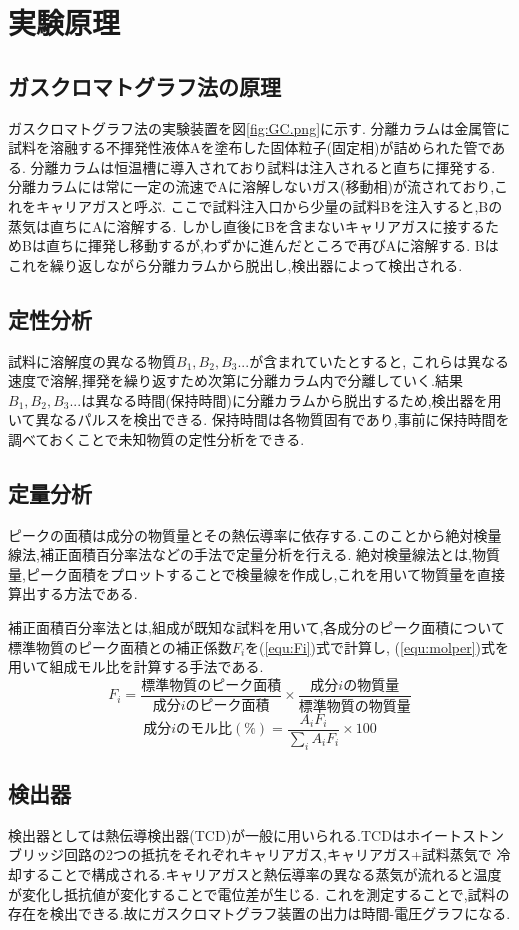 \section{実験原理}
\subsection{ガスクロマトグラフ法の原理}
ガスクロマトグラフ法の実験装置を図\ref{fig:GC.png}に示す.
分離カラムは金属管に試料を溶融する不揮発性液体Aを塗布した固体粒子(固定相)が詰められた管である.
分離カラムは恒温槽に導入されており試料は注入されると直ちに揮発する.
分離カラムには常に一定の流速でAに溶解しないガス(移動相)が流されており,これをキャリアガスと呼ぶ.
ここで試料注入口から少量の試料Bを注入すると,Bの蒸気は直ちにAに溶解する.
しかし直後にBを含まないキャリアガスに接するためBは直ちに揮発し移動するが,わずかに進んだところで再びAに溶解する.
Bはこれを繰り返しながら分離カラムから脱出し,検出器によって検出される.
\subsection{定性分析}
試料に溶解度の異なる物質$B_1,B_2,B_3...$が含まれていたとすると,
これらは異なる速度で溶解,揮発を繰り返すため次第に分離カラム内で分離していく.結果$B_1,B_2,B_3...$は異なる時間(保持時間)に分離カラムから脱出するため,検出器を用いて異なるパルスを検出できる.
保持時間は各物質固有であり,事前に保持時間を調べておくことで未知物質の定性分析をできる.
\subsection{定量分析}
ピークの面積は成分の物質量とその熱伝導率に依存する.このことから絶対検量線法,補正面積百分率法などの手法で定量分析を行える.
絶対検量線法とは,物質量,ピーク面積をプロットすることで検量線を作成し,これを用いて物質量を直接算出する方法である.

補正面積百分率法とは,組成が既知な試料を用いて,各成分のピーク面積について標準物質のピーク面積との補正係数$F_i$を(\ref{equ:Fi})式で計算し\cite{rikougaku},
(\ref{equ:molper})式を用いて組成モル比を計算する手法である.
\begin{equation}
  \label{equ:Fi}
  F_i=\frac{標準物質のピーク面積}{成分iのピーク面積}\times\frac{成分iの物質量}{標準物質の物質量}
\end{equation}
\begin{equation}
  \label{equ:molper}
  成分iのモル比(\%)=\frac{A_i F_i}{\sum_i A_i F_i}\times100
\end{equation}
\subsection{検出器}
検出器としては熱伝導検出器(TCD)が一般に用いられる.TCDはホイートストンブリッジ回路の2つの抵抗をそれぞれキャリアガス,キャリアガス+試料蒸気で
冷却することで構成される.キャリアガスと熱伝導率の異なる蒸気が流れると温度が変化し抵抗値が変化することで電位差が生じる.
これを測定することで,試料の存在を検出できる.故にガスクロマトグラフ装置の出力は時間-電圧グラフになる.
